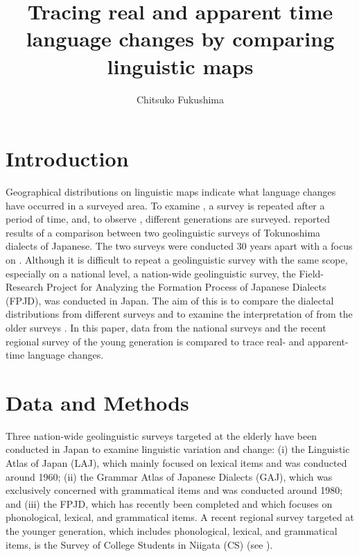 \documentclass[output=paper]{LSP/langsci}
\author{Chitsuko Fukushima\affiliation{University of Niigata Prefecture, Faculty of International Studies and Regional Development}}
\title{Tracing real and apparent time language changes by comparing linguistic maps}
\begin{document}
\section{Introduction}
Geographical distributions on linguistic maps indicate what language changes have occurred in a surveyed area. To examine , a survey is repeated after a period of time, and, to observe , different generations are surveyed. \citet{fukushima_revisiting_2013} reported results of a comparison between two geolinguistic surveys of Tokunoshima dialects of Japanese. The two surveys were conducted 30 years apart with a focus on . Although it is difficult to repeat a geolinguistic survey with the same scope, especially on a national level, a nation-wide geolinguistic survey, the Field-Research Project for Analyzing the Formation Process of Japanese Dialects (\textsc{FPJD}), was conducted in Japan. The aim of this  is to compare the dialectal distributions from different surveys and to examine the interpretation of  from the older surveys \citep{onishi_timespan_2014}. In this paper, data from the national surveys and the recent regional survey of the young generation is compared to trace real- and apparent-time language changes.

\section{Data and Methods}

Three nation-wide geolinguistic surveys targeted at the elderly have been conducted in Japan to examine linguistic variation and change: (i) the Linguistic Atlas of Japan (\textsc{LAJ}), which mainly focused on lexical items and was conducted around 1960; (ii) the Grammar Atlas of Japanese Dialects (\textsc{GAJ}), which was exclusively concerned with grammatical items and was conducted around 1980; and (iii) the \textsc{FPJD}, which has recently been completed and which focuses on phonological, lexical, and grammatical items. A recent regional survey targeted at the younger generation, which includes phonological, lexical, and grammatical items, is the Survey of College Students in Niigata (\textsc{CS}) (see ).
\end{document}
